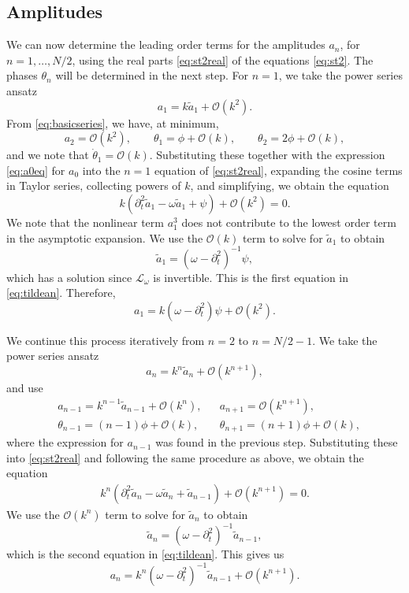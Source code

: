 \documentclass[11pt,reqno]{amsart}
\def\Lw{{\mathcal{L}_\omega}}
\begin{document}
\subsection{Amplitudes}

We can now determine the leading order terms for the amplitudes $a_n$, for $n = 1, \dots, N/2$, using the real parts \cref{eq:st2real} of the equations \cref{eq:st2}. The phases $\theta_n$ will be determined in the next step. For $n=1$, we take the power series ansatz 
\[
a_1 = k \widetilde{a}_1 + \mathcal{O}(k^2).
\]
From \cref{eq:basicseries}, we have, at minimum,
\[
a_2 = \mathcal{O}(k^2), \qquad \theta_1 = \phi + \mathcal{O}(k), \qquad \theta_2 = 2 \phi + \mathcal{O}(k),
\]
and we note that $\dot \theta_1 = \mathcal{O}(k)$. Substituting these together with the expression \cref{eq:a0eq} for $a_0$ into the $n=1$ equation of \cref{eq:st2real}, expanding the cosine terms in Taylor series, collecting powers of $k$, and simplifying, we obtain the equation
\[
k\left(\partial_t^2 \widetilde{a}_1 - \omega \widetilde{a}_1 + \psi\right) + \mathcal{O}(k^2) = 0.
\]
We note that the nonlinear term $a_1^3$ does not contribute to the lowest order term in the asymptotic expansion. We use the $\mathcal{O}(k)$ term to solve for $\widetilde{a}_1$ to obtain
\begin{equation}\label{eq:a11}
\widetilde{a}_1 = (\omega - \partial_t^2)^{-1} \psi,
\end{equation}
which has a solution since $\Lw$ is invertible. This is the first equation in \cref{eq:tildean}. Therefore,
\begin{equation}\label{eq:a1eq}
a_1 = k (\omega - \partial_t^2) \psi + \mathcal{O}(k^2).
\end{equation}

We continue this process iteratively from $n=2$ to $n=N/2-1$. We take the power series ansatz 
\[
a_n = k^n \widetilde{a}_n + \mathcal{O}(k^{n+1}),
\]
and use
\begin{align*}
&a_{n-1} = k^{n-1} \widetilde{a}_{n-1} + \mathcal{O}(k^{n}), &&a_{n+1} = \mathcal{O}(k^{n+1}), \\
&\theta_{n-1} = (n-1) \phi + \mathcal{O}(k), &&\theta_{n+1} = (n+1) \phi + \mathcal{O}(k),
\end{align*}
where the expression for $a_{n-1}$ was found in the previous step. Substituting these into \cref{eq:st2real} and following the same procedure as above, we obtain the equation
\begin{align*}
k^n\left(\partial_t^2 \widetilde{a}_n - \omega \widetilde{a}_n + \widetilde{a}_{n-1} \right) +\mathcal{O}(k^{n+1}) = 0.
\end{align*}
We use the $\mathcal{O}(k^n)$ term to solve for $\widetilde{a}_n$ to obtain
\begin{equation}\label{eq:ann}
\widetilde{a}_n = (\omega - \partial_t^2)^{-1}\widetilde{a}_{n-1},
\end{equation}
which is the second equation in \cref{eq:tildean}. This gives us
\begin{equation}\label{eq:aneq}
a_n = k^n (\omega - \partial_t^2)^{-1} \widetilde{a}_{n-1} + \mathcal{O}(k^{n+1}).
\end{equation}
\end{document}
